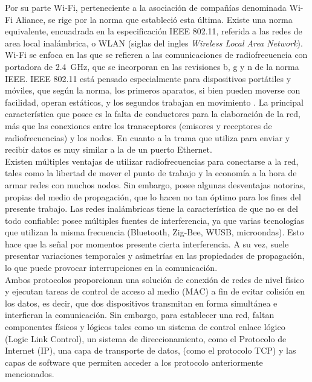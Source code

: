 Por su parte Wi-Fi, perteneciente a la asociación de compañías denominada Wi-Fi Aliance, se rige por la norma que estableció esta última. Existe una norma equivalente, encuadrada en la especificación IEEE 802.11, referida a las redes de area local inalámbrica, o WLAN (siglas del ingles {\it Wireless Local Area Network}). Wi-Fi se enfoca en las que se refieren a las comunicaciones de radiofrecuencia con portadora de \SI{2,4}{\giga\hertz}, que se incorporan en las revisiones b, g y n de la norma IEEE. IEEE 802.11 está pensado especialmente para dispositivos portátiles y móviles, que según la norma, los primeros aparatos, si bien pueden moverse con facilidad, operan estáticos, y los segundos trabajan en movimiento \cite{wifi2016}. La principal característica que posee es la falta de conductores para la elaboración de la red, más que las conexiones entre los transceptores (emisores y receptores de radiofrecuencias) y los nodos. En cuanto a la trama que utiliza para enviar y recibir datos es muy similar a la de un puerto Ethernet.\\

Existen múltiples ventajas de utilizar radiofrecuencias para conectarse a la red, tales como la libertad de mover el punto de trabajo y la economía a la hora de armar redes con muchos nodos. Sin embargo, posee algunas desventajas notorias, propias del medio de propagación, que lo hacen no tan óptimo para los fines del presente trabajo. Las redes inalámbricas tiene la característica de que no es del todo confiable: posee múltiples fuentes de interferencia, ya que varias tecnologías que utilizan la misma frecuencia (Bluetooth, Zig-Bee, WUSB, microondas). Esto hace que la señal por momentos presente cierta interferencia. A su vez, suele presentar variaciones temporales y asimetrías en las propiedades de propagación, lo que puede provocar interrupciones en la comunicación.\\

Ambos protocolos proporcionan una solución de conexión de redes de nivel físico y ejecutan tareas de control de acceso al medio (MAC) a fin de evitar colisión en los datos, es decir, que dos dispositivos transmitan en forma simultánea e interfieran la comunicación.
Sin embargo, para establecer una red, faltan componentes físicos y lógicos tales como un sistema de control enlace lógico (Logic Link Control), un sistema de direccionamiento, como el Protocolo de Internet (IP), una capa de transporte de datos, (como el protocolo TCP) y las capas de software que permiten acceder a los protocolo anteriormente mencionados.\\

